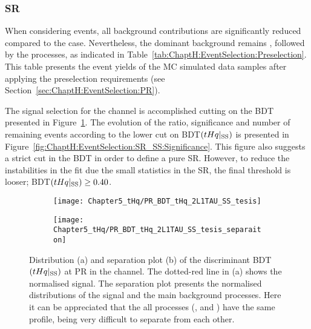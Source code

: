 \FloatBarrier
\subsubsection{SR \dilepSStau}
\label{sec:ChaptH:EventSelection:SR:SS}
When considering \dilepSStau events, all background contributions 
are significantly reduced compared to the \dilepOStau case. Nevertheless, the dominant 
background remains \ttbar, followed by the \ttX processes, as indicated in 
Table~\ref{tab:ChaptH:EventSelection:Preselection}.  This table presents the event yields 
of the MC simulated data samples after applying the preselection requirements 
(see Section~\ref{sec:ChaptH:EventSelection:PR}). 

The signal selection for the \dilepSStau channel is accomplished 
cutting on the BDT presented in Figure~\ref{fig:ChaptH:EventSelection:SR:SS:BDT_score_distribution}.
The evolution of the \StoB ratio, significance and number of remaining \tHq events according to the 
lower cut on BDT$(tHq|_{\text{SS}})$ is presented in Figure~\ref{fig:ChaptH:EventSelection:SR_SS:Significance}. 
This figure also suggests a strict cut in the BDT in order to define a pure SR. 
However, to reduce the instabilities in the fit due the small statistics in the SR, the final
threshold is looser; BDT$(tHq|_{\text{SS}})\geq 0.40$. 

\begin{figure}[h]
\centering
\begin{subfigure}{.45\textwidth}
  \centering
  \texttt{[image: Chapter5\_tHq/PR\_BDT\_tHq\_2L1TAU\_SS\_tesis]}
  \caption{}%
\end{subfigure}%
\begin{subfigure}{.5 \textwidth}
  \centering
  \texttt{[image: Chapter5\_tHq/PR\_BDT\_tHq\_2L1TAU\_SS\_tesis\_separaiton]}
  \caption{}%
\end{subfigure}
\caption{Distribution (a) and separation plot (b) of the discriminant BDT$(tHq|_{\text{SS}})$ at PR in the \dilepSStau channel.
The dotted-red line in (a) shows the normalised \tHq signal.
The separation plot presents the normalised distributions of the \tHq signal and the main background processes.
Here it can be appreciated that the all \ttX processes (\ttW,  \ttH and \ttZ) have the same profile, being very difficult to separate from 
each other.}
\label{fig:ChaptH:EventSelection:SR:SS:BDT_score_distribution}
\end{figure}


